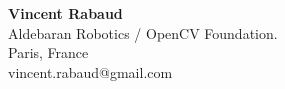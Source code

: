 \textbf{Vincent Rabaud}\\
Aldebaran Robotics / OpenCV Foundation.\\
Paris, France\\
vincent.rabaud@gmail.com
